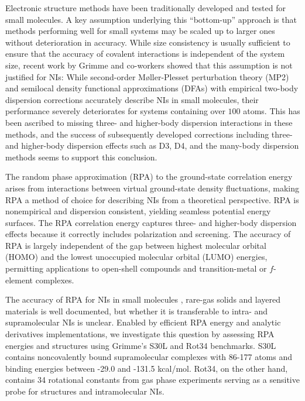 \documentclass[twoside,twocolumn,9pt]{article}
\begin{document}
Electronic structure methods have been traditionally developed and
tested for small molecules. A key assumption underlying this ``bottom-up''
approach is that methods performing well for small systems may be scaled
up to larger ones without deterioration in accuracy. While size
consistency \cite{Bartlett77IntJQuantumChem12p165}
is usually sufficient to
ensure that the accuracy of covalent interactions is independent
of the system size, recent work by Grimme and co-workers showed that
this assumption is not justified for NIs: While second-order
M{\o}ller-Plesset perturbation theory (MP2) and semilocal density
functional approximations (DFAs) with empirical two-body dispersion
corrections\cite{Grimme06JComputChem27p1787} accurately describe NIs
in small molecules, their performance severely deteriorates for systems
containing over $100$ atoms\cite{Grimme12ChemEurJ18p9955}. This has been
ascribed to missing three- and higher-body dispersion interactions in
these methods, and the success of subsequently developed corrections
including three- and higher-body dispersion effects such as 
D3,\cite{Grimme12ChemEurJ18p9955} D4,\cite{Caldeweyher17JChemPhys147p034112}
and the many-body dispersion
methods \cite{Tkatchenko12PhysRevLett108p236402} seems to support this
conclusion.

The random phase approximation (RPA) to the ground-state correlation
energy\cite{Langreth75SolidStateCommun17p1425,
Langreth77PhysRevB15p2884} arises from interactions between
virtual ground-state density fluctuations,\cite{Bohm53PhysRev92p609,
Furche08JChemPhys129p114105}
making RPA a method of
choice for describing NIs from a theoretical perspective.
\cite{Dobson05IntJQuantumChem101p579, Dobson12JPhysCondensMatter24p073201}
RPA is nonempirical and
dispersion consistent, yielding seamless potential energy surfaces.
The RPA correlation energy captures three- and higher-body dispersion
effects because it correctly includes polarization and
screening.\cite{Chen17AnnuRevPhysChem68p421}
The accuracy of RPA is
largely independent of the gap between highest molecular orbital (HOMO)
and the lowest unoccupied molecular orbital (LUMO) energies, permitting
applications to open-shell compounds and transition-metal or $f$-element
complexes. 

The accuracy of RPA for NIs in small molecules
\cite{Eshuis11JPhysChemLett2p983}, rare-gas solids
\cite{Harl09PhysRevLett103p056401} and layered materials  is well 
documented, but whether it is transferable to intra- and supramolecular NIs is
unclear. Enabled by efficient RPA energy
\cite{Eshuis10JChemPhys132p234114} and analytic derivatives
\cite{Burow14JChemTheoryComput10p180} 
implementations, we investigate this question by assessing RPA energies and 
structures using Grimme's S30L and Rot34 benchmarks. S30L contains
noncovalently bound supramolecular complexes with 86-177 atoms and
binding energies between -29.0 and -131.5 kcal/mol. Rot34, on the other
hand, contains 34 rotational constants from gas phase experiments
serving as a sensitive probe for structures and intramolecular
NIs. 
\end{document}

